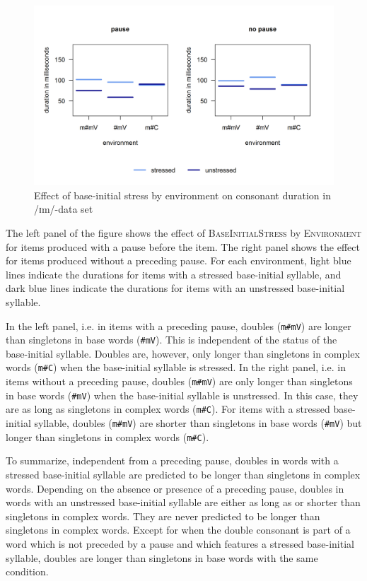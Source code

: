 \begin{figure}
	
	\includegraphics [scale=0.6] {images/Experiment/imModelCompleteInterEnvStressPause}
	
	\caption{Effect of base-initial stress by environment on consonant duration in /ɪm/-data set}
	\label{fig:NumNasal imCompleteexperiment}
\end{figure}


The left panel of the figure shows the effect of \textsc{BaseInitialStress} by \textsc{Environment} for items produced with a pause before the item. The right panel shows the effect for items produced without a preceding pause. For each environment, light blue lines indicate the durations for items with a stressed base-initial syllable, and dark blue lines indicate the durations for items with an unstressed base-initial syllable.


In the left panel, i.e. in items with a preceding pause, doubles (\texttt{m\#mV}) are longer than singletons in base words (\texttt{\#mV}). This is independent of the  status of the base-initial syllable. Doubles are, however, only longer than singletons in complex words (\texttt{m\#C}) when the base-initial syllable is stressed.
In the right panel, i.e. in items without a preceding pause, doubles (\texttt{m\#mV}) are only longer than singletons in base words (\texttt{\#mV}) when the base-initial syllable is unstressed. In this case, they are as long as singletons in complex words (\texttt{m\#C}). For items with a stressed base-initial syllable, doubles (\texttt{m\#mV}) are shorter than singletons in base words (\texttt{\#mV}) but longer than singletons in complex words (\texttt{m\#C}).

To summarize, independent from a preceding pause, doubles in words with a stressed base-initial syllable are predicted to be longer than singletons in complex words. Depending on the absence or presence of a preceding pause, doubles in words with an unstressed base-initial syllable are either as long as or shorter than singletons in complex words. They are never predicted to be longer than singletons in complex words. 
Except for when the double consonant is part of a word which is not preceded by a pause and which features a stressed base-initial syllable, doubles are longer than singletons in base words with the same condition.


